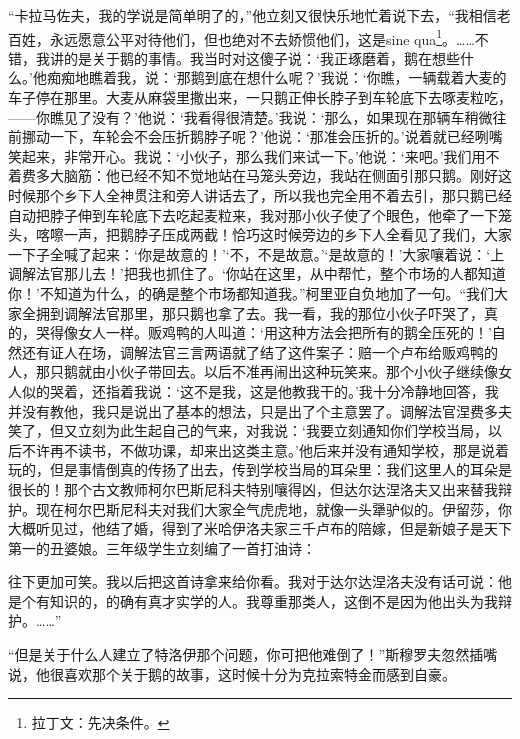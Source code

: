 \par “卡拉马佐夫，我的学说是简单明了的，”他立刻又很快乐地忙着说下去，“我相信老百姓，永远愿意公平对待他们，但也绝对不去娇惯他们，这是sine qua\footnote{拉丁文：先决条件。}。……不错，我讲的是关于鹅的事情。我当时对这傻子说：‘我正琢磨着，鹅在想些什么。’他痴痴地瞧着我，说：‘那鹅到底在想什么呢？’我说：‘你瞧，一辆载着大麦的车子停在那里。大麦从麻袋里撒出来，一只鹅正伸长脖子到车轮底下去啄麦粒吃，——你瞧见了没有？’他说：‘我看得很清楚。’我说：‘那么，如果现在那辆车稍微往前挪动一下，车轮会不会压折鹅脖子呢？’他说：‘那准会压折的。’说着就已经咧嘴笑起来，非常开心。我说：‘小伙子，那么我们来试一下。’他说：‘来吧。’我们用不着费多大脑筋：他已经不知不觉地站在马笼头旁边，我站在侧面引那只鹅。刚好这时候那个乡下人全神贯注和旁人讲话去了，所以我也完全用不着去引，那只鹅已经自动把脖子伸到车轮底下去吃起麦粒来，我对那小伙子使了个眼色，他牵了一下笼头，喀嚓一声，把鹅脖子压成两截！恰巧这时候旁边的乡下人全看见了我们，大家一下子全喊了起来：‘你是故意的！’‘不，不是故意。’‘是故意的！’大家嚷着说：‘上调解法官那儿去！’把我也抓住了。‘你站在这里，从中帮忙，整个市场的人都知道你！’不知道为什么，的确是整个市场都知道我。”柯里亚自负地加了一句。“我们大家全拥到调解法官那里，那只鹅也拿了去。我一看，我的那位小伙子吓哭了，真的，哭得像女人一样。贩鸡鸭的人叫道：‘用这种方法会把所有的鹅全压死的！’自然还有证人在场，调解法官三言两语就了结了这件案子：赔一个卢布给贩鸡鸭的人，那只鹅就由小伙子带回去。以后不准再闹出这种玩笑来。那个小伙子继续像女人似的哭着，还指着我说：‘这不是我，这是他教我干的。’我十分冷静地回答，我并没有教他，我只是说出了基本的想法，只是出了个主意罢了。调解法官涅费多夫笑了，但又立刻为此生起自己的气来，对我说：‘我要立刻通知你们学校当局，以后不许再不读书，不做功课，却来出这类主意。’他后来并没有通知学校，那是说着玩的，但是事情倒真的传扬了出去，传到学校当局的耳朵里：我们这里人的耳朵是很长的！那个古文教师柯尔巴斯尼科夫特别嚷得凶，但达尔达涅洛夫又出来替我辩护。现在柯尔巴斯尼科夫对我们大家全气虎虎地，就像一头犟驴似的。伊留莎，你大概听见过，他结了婚，得到了米哈伊洛夫家三千卢布的陪嫁，但是新娘子是天下第一的丑婆娘。三年级学生立刻编了一首打油诗：
\par 往下更加可笑。我以后把这首诗拿来给你看。我对于达尔达涅洛夫没有话可说：他是个有知识的，的确有真才实学的人。我尊重那类人，这倒不是因为他出头为我辩护。……”
\par “但是关于什么人建立了特洛伊那个问题，你可把他难倒了！”斯穆罗夫忽然插嘴说，他很喜欢那个关于鹅的故事，这时候十分为克拉索特金而感到自豪。
